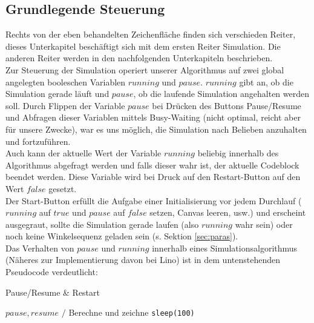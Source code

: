 \subsection{Grundlegende Steuerung}
\label{sec:steering}
Rechts von der  eben behandelten Zeichenfläche finden sich verschieden Reiter, dieses Unterkapitel beschäftigt sich mit dem ersten Reiter \glqq{}Simulation\grqq{}. Die anderen Reiter werden in den nachfolgenden Unterkapiteln beschrieben. \\
Zur Steuerung der Simulation operiert unserer Algorithmus auf zwei global angelegten booleschen Variablen $running$ und $pause$. $running$ gibt an, ob die Simulation gerade läuft und $pause$, ob die laufende Simulation angehalten werden soll. Durch Flippen der Variable $pause$ bei Drücken des Buttons \glqq{}Pause/Resume\grqq{} und Abfragen dieser Variablen mittels \glqq{}Busy-Waiting\grqq{} (nicht optimal, reicht aber für unsere Zwecke), war es uns möglich, die Simulation nach Belieben anzuhalten und fortzuführen. \\
Auch kann der aktuelle Wert der Variable $running$ beliebig innerhalb des Algorithmus abgefragt werden und falls dieser wahr ist, der aktuelle  Codeblock beendet werden. Diese Variable wird bei Druck auf den \glqq{}Restart\grqq{}-Button auf den Wert $false$ gesetzt. \\
Der Start-Button erfüllt die Aufgabe einer Initialisierung vor jedem Durchlauf ($running$ auf $true$ und $pause$ auf $false$ setzen, Canvas leeren, usw.) und erscheint ausgegraut, sollte die Simulation gerade laufen (also $running$ wahr sein) oder noch keine Winkelsequenz geladen sein (s. Sektion \ref{sec:paras}). \\
Das Verhalten von $pause$ und $running$ innerhalb eines Simulationsalgorithmus (Näheres zur Implementierung davon bei Lino) ist in dem untenstehenden Pseudocode verdeutlicht:

\begin{algorithm}
\caption{Pause/Resume \& Restart}\label{alg:pause_restart}
\begin{algorithmic}[1]
\Require $pause, resume$
\Ensure $/$
	\State Berechne und zeichne
		\State \texttt{sleep(100)}  
	\EndWhile
    	\Return						{}
	\EndIf
\EndWhile
\end{algorithmic}
\end{algorithm}

